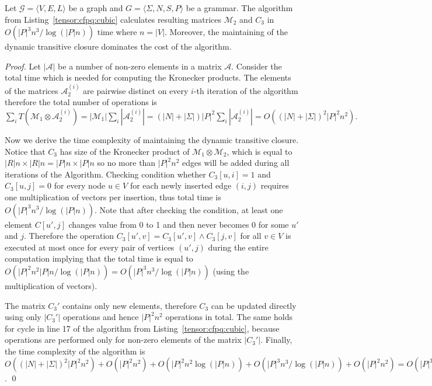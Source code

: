 \begin{theorem}{}
\label{theorem: subcubic}
    Let $\mathcal{G} = \langle V,E,L \rangle$ be a graph and $G = \langle\Sigma, N, S, P\rangle$ be a grammar.
    The algorithm from Listing~\ref{tensor:cfpq:cubic} calculates resulting matrices $\mathcal{M}_2$ and $C_3$ in $O({|P|}^3n^3/\log (|P|n))$ time where $n = |V|$. Moreover, the maintaining of the dynamic transitive closure dominates the cost of the algorithm.
\end{theorem}

\begin{proof}
 Let $|\mathcal{A}|$ be a number of non-zero elements in a matrix $\mathcal{A}$. Consider the total time which is needed for computing the Kronecker products. The elements of the matrices $\mathcal{A}_2^{(i)}$ are pairwise distinct on every $i$-th iteration of the algorithm therefore the total number of operations is $\sum\limits_i{T(\mathcal{M}_1 \otimes \mathcal{A}_2^{(i)})} = |\mathcal{M}_1| \sum\limits_i {|\mathcal{A}_2^{(i)}|} = (|N| + |\Sigma|){|P|}^2 \sum\limits_i {|\mathcal{A}_2^{(i)}|} = O({(|N| + |\Sigma|)}^2{|P|}^2 n^2).$


Now we derive the time complexity of maintaining the dynamic transitive closure.
Notice that $C_3$ has size of the Kronecker product of $\mathcal{M}_1 \otimes \mathcal{M}_2$, which is equal to $|R|n \times |R|n = |P|n \times |P|n$ so no more than ${|P|}^2n^2$ edges will be added during all iterations of the Algorithm.
Checking condition whether $C_3[u, i] = 1$ and $C_3[u, j]=0$ for every node $u \in V$ for each newly inserted edge $(i, j)$ requires one multiplication of vectors per insertion, thus total time is $O({|P|}^3n^3/\log (|P|n))$.
Note that after checking the condition, at least one element $C[u', j]$ changes value from 0 to 1 and then never becomes 0 for some $u'$ and $j$.
Therefore the operation $C_3[u',v] = C_3[u', v] \wedge C_3[j, v]$ for all $v \in V$ is executed at most once for every pair of vertices $(u',j)$ during the entire computation implying that the total time is equal to $O({|P|}^2n^2|P|n/\log (|P|n))=O({|P|}^3n^3/\log (|P|n))$ (using the  multiplication of vectors).


The matrix $C_3'$ contains only new elements, therefore $C_3$ can be updated directly using only $|C_3'|$ operations and hence ${|P|}^2n^2$ operations in total.
The same holds for cycle in line 17 of the algorithm from Listing~\ref{tensor:cfpq:cubic}, because operations are performed only for non-zero elements of the matrix $|C_3'|$.
Finally, the time complexity of the algorithm is $O({(|N| + |\Sigma|)}^2{|P|}^2 n^2) + O({|P|}^2n^2) + O({|P|}^2n^2 \log (|P|n)) + O({|P|}^3n^3/\log (|P|n)) + O({|P|}^2n^2)= O({|P|}^3n^3/\log (|P|n))$. \qed
\end{proof}

